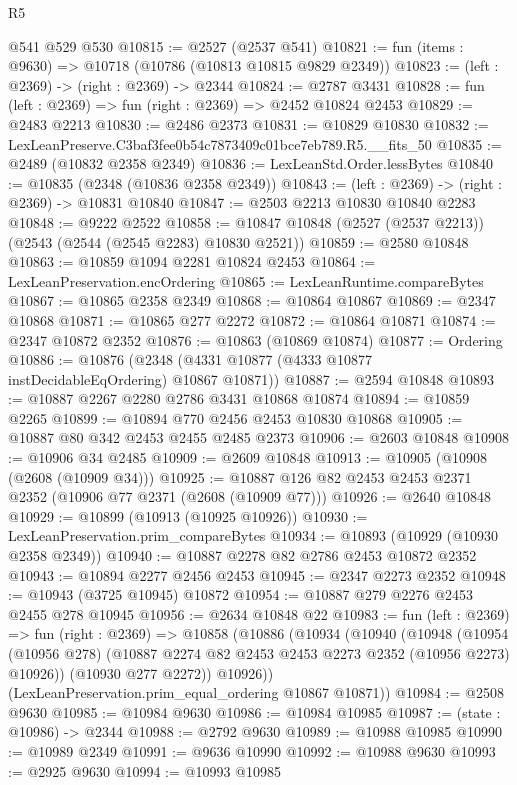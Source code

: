 \begin{lexlean}{R5}
\begin{coremodule}
    @541
    @529
    @530
@10815 := @2527 (@2537 @541)
@10821 := fun (items : @9630) => @10718 (@10786 (@10813 @10815 @9829 @2349))
@10823 := (left : @2369) -> (right : @2369) -> @2344
@10824 := @2787 @3431
@10828 := fun (left : @2369) => fun (right : @2369) => @2452 @10824 @2453
@10829 := @2483 @2213
@10830 := @2486 @2373
@10831 := @10829 @10830
@10832 := LexLeanPreserve.C3baf3fee0b54c7873409c01bce7eb789.R5.__fits_50
@10835 := @2489 (@10832 @2358 @2349)
@10836 := LexLeanStd.Order.lessBytes
@10840 := @10835 (@2348 (@10836 @2358 @2349))
@10843 := (left : @2369) -> (right : @2369) -> @10831 @10840
@10847 := @2503 @2213 @10830 @10840 @2283
@10848 := @9222 @2522
@10858 := @10847 @10848 (@2527 (@2537 @2213)) (@2543 (@2544 (@2545 @2283) @10830 @2521))
@10859 := @2580 @10848
@10863 := @10859 @1094 @2281 @10824 @2453
@10864 := LexLeanPreservation.encOrdering
@10865 := LexLeanRuntime.compareBytes
@10867 := @10865 @2358 @2349
@10868 := @10864 @10867
@10869 := @2347 @10868
@10871 := @10865 @277 @2272
@10872 := @10864 @10871
@10874 := @2347 @10872 @2352
@10876 := @10863 (@10869 @10874)
@10877 := Ordering
@10886 := @10876 (@2348 (@4331 @10877 (@4333 @10877 instDecidableEqOrdering) @10867 @10871))
@10887 := @2594 @10848
@10893 := @10887 @2267 @2280 @2786 @3431 @10868 @10874
@10894 := @10859 @2265
@10899 := @10894 @770 @2456 @2453 @10830 @10868
@10905 := @10887 @80 @342 @2453 @2455 @2485 @2373
@10906 := @2603 @10848
@10908 := @10906 @34 @2485
@10909 := @2609 @10848
@10913 := @10905 (@10908 (@2608 (@10909 @34)))
@10925 := @10887 @126 @82 @2453 @2453 @2371 @2352 (@10906 @77 @2371 (@2608 (@10909 @77)))
@10926 := @2640 @10848
@10929 := @10899 (@10913 (@10925 @10926))
@10930 := LexLeanPreservation.prim_compareBytes
@10934 := @10893 (@10929 (@10930 @2358 @2349))
@10940 := @10887 @2278 @82 @2786 @2453 @10872 @2352
@10943 := @10894 @2277 @2456 @2453
@10945 := @2347 @2273 @2352
@10948 := @10943 (@3725 @10945) @10872
@10954 := @10887 @279 @2276 @2453 @2455 @278 @10945
@10956 := @2634 @10848 @22
@10983 := fun (left : @2369) =>
  fun (right : @2369) =>
  @10858
    (@10886
      (@10934
        (@10940
          (@10948
            (@10954 (@10956 @278) (@10887 @2274 @82 @2453 @2453 @2273 @2352 (@10956 @2273) @10926))
            (@10930 @277 @2272))
          @10926))
      (LexLeanPreservation.prim_equal_ordering @10867 @10871))
@10984 := @2508 @9630
@10985 := @10984 @9630
@10986 := @10984 @10985
@10987 := (state : @10986) -> @2344
@10988 := @2792 @9630
@10989 := @10988 @10985
@10990 := @10989 @2349
@10991 := @9636 @10990
@10992 := @10988 @9630
@10993 := @2925 @9630
@10994 := @10993 @10985

\end{coremodule}
\end{lexlean}
